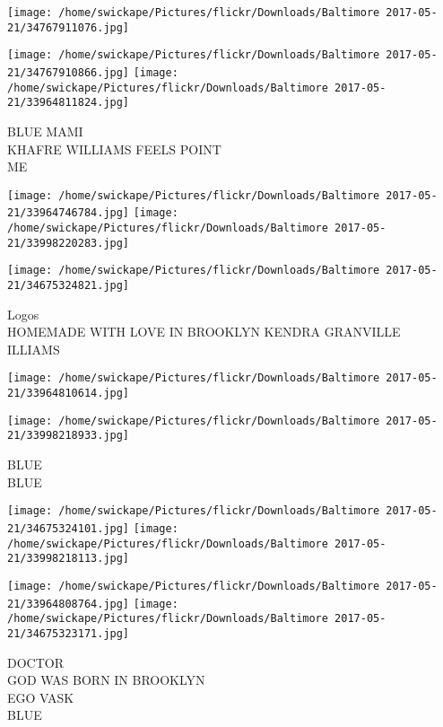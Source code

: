 \documentclass[10pt,letterpaper]{article}
\begin{document}
\texttt{[image: /home/swickape/Pictures/flickr/Downloads/Baltimore 2017-05-21/34767911076.jpg]}

\vspace{0.25in}
\texttt{[image: /home/swickape/Pictures/flickr/Downloads/Baltimore 2017-05-21/34767910866.jpg]}
\texttt{[image: /home/swickape/Pictures/flickr/Downloads/Baltimore 2017-05-21/33964811824.jpg]}

BLUE MAMI\\
KHAFRE WILLIAMS FEELS POINT\\
ME\\
\pagebreak

\texttt{[image: /home/swickape/Pictures/flickr/Downloads/Baltimore 2017-05-21/33964746784.jpg]}
\texttt{[image: /home/swickape/Pictures/flickr/Downloads/Baltimore 2017-05-21/33998220283.jpg]}

\texttt{[image: /home/swickape/Pictures/flickr/Downloads/Baltimore 2017-05-21/34675324821.jpg]}

Logos\\
HOMEMADE WITH LOVE IN BROOKLYN KENDRA GRANVILLE\\
ILLIAMS\\
\pagebreak

\texttt{[image: /home/swickape/Pictures/flickr/Downloads/Baltimore 2017-05-21/33964810614.jpg]}

\vspace{0.25in}
\texttt{[image: /home/swickape/Pictures/flickr/Downloads/Baltimore 2017-05-21/33998218933.jpg]}

BLUE\\
BLUE\\
\pagebreak

\texttt{[image: /home/swickape/Pictures/flickr/Downloads/Baltimore 2017-05-21/34675324101.jpg]}
\texttt{[image: /home/swickape/Pictures/flickr/Downloads/Baltimore 2017-05-21/33998218113.jpg]}

\texttt{[image: /home/swickape/Pictures/flickr/Downloads/Baltimore 2017-05-21/33964808764.jpg]}
\texttt{[image: /home/swickape/Pictures/flickr/Downloads/Baltimore 2017-05-21/34675323171.jpg]}

DOCTOR\\
GOD WAS BORN IN BROOKLYN\\
EGO VASK\\
BLUE\\
\pagebreak
\end{document}
